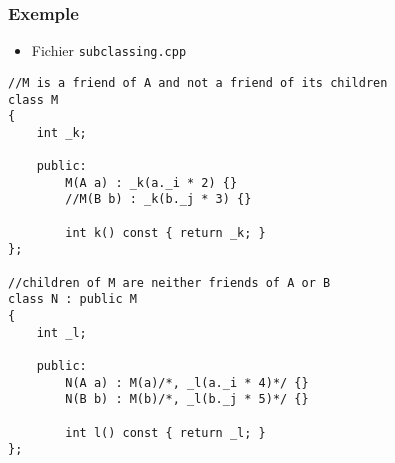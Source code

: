 \begin{frame}[containsverbatim]
\frametitle{Exemple}
\begin{itemize}
\item Fichier \texttt{subclassing.cpp}
\end{itemize}
\begin{lstlisting}
//M is a friend of A and not a friend of its children
class M
{
	int _k;

	public:
		M(A a) : _k(a._i * 2) {}
		//M(B b) : _k(b._j * 3) {}

		int k() const { return _k; }
};

//children of M are neither friends of A or B
class N : public M
{
	int _l;

	public:
		N(A a) : M(a)/*, _l(a._i * 4)*/ {}
		N(B b) : M(b)/*, _l(b._j * 5)*/ {}

		int l() const { return _l; }
};
\end{lstlisting}
\end{frame}

